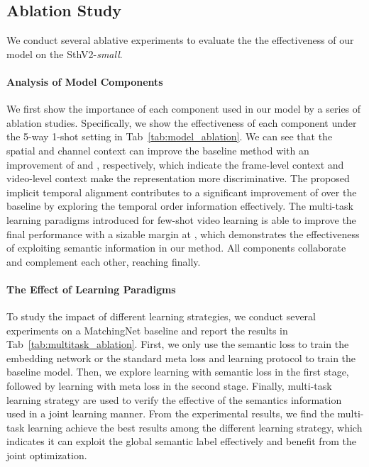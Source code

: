 \documentclass{article}
\begin{document}
\subsection{Ablation Study}
We conduct several ablative experiments to evaluate the the effectiveness of our model on the SthV2-\textit{small}.



\paragraph{Analysis of Model Components}\label{sec:ablation}
We first show the importance of each component used in our model by a series of ablation studies.
Specifically, we show the effectiveness of each component under the 5-way 1-shot setting in Tab~\ref{tab:model_ablation}. We can see that the spatial and channel context can improve the baseline method with an improvement of  and , respectively, which indicate the frame-level context and video-level context make the representation more discriminative. The proposed implicit temporal alignment contributes to a significant improvement of  over the baseline by exploring the temporal order information effectively. The multi-task learning paradigms introduced for few-shot video learning is able to improve the final performance with a sizable margin at , which demonstrates the effectiveness of exploiting semantic information in our method. All components collaborate and complement each other, reaching  finally.


\paragraph{The Effect of Learning Paradigms} To study the impact of different learning strategies, we conduct several experiments on a MatchingNet baseline and report the results in Tab~\ref{tab:multitask_ablation}.
First, we only use the semantic loss to train the embedding network or the standard meta loss and learning protocol to train the baseline model. 
Then, we explore learning with semantic loss in the first stage, followed by learning with meta loss in the second stage. Finally, multi-task learning strategy are used to verify the effective of the semantics information used in a joint learning manner. From the experimental results, we find the multi-task learning achieve the best results among the different learning strategy, which indicates it can exploit the global semantic label effectively and benefit from the joint optimization.
\end{document}
